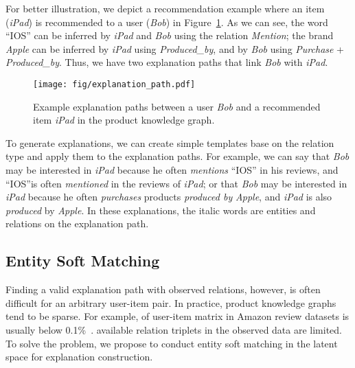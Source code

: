 \documentclass[algorithms,article,accept,moreauthors,pdftex,10pt,a4paper]{Definitions/mdpi}
\begin{document}
For better illustration, we depict a recommendation example where an item (\textit{iPad}) is recommended to a user (\textit{Bob}) in Figure~\ref{fig:example_path}.
As we can see, the word ``IOS'' can be inferred by \textit{iPad} and \textit{Bob} using the relation \textit{Mention}; the brand \textit{Apple} can be inferred by \textit{iPad} using \textit{Produced\_by}, and by \textit{Bob} using \textit{Purchase} + \textit{Produced\_by}.
Thus, we have two explanation paths that link \textit{Bob} with \textit{iPad}.
\begin{figure}[H]
	\centering
	\texttt{[image: fig/explanation\_path.pdf]}
	\caption{Example explanation paths between a user \textit{Bob} and a recommended item \textit{iPad} in the product knowledge graph.}		\vspace{-10pt}
	\label{fig:example_path}
\end{figure}



To generate explanations, we can create simple templates base on the relation type and apply them to the explanation paths.
For example, we can say that \textit{Bob} may be interested in \textit{iPad} because he often \textit{mentions} ``IOS'' in his reviews, and ``IOS''is often \textit{mentioned} in the reviews of \textit{iPad}; or that \textit{Bob} may be interested in \textit{iPad} because he often \textit{purchases} products \textit{produced by} \textit{Apple}, and \textit{iPad} is also \textit{produced} by \textit{Apple}. In these explanations, the italic words are entities and relations on the explanation path.

\subsection{Entity Soft Matching}

Finding a valid explanation path with observed relations, however, is often difficult for an arbitrary user-item pair.
In practice, product knowledge graphs tend to be sparse.
For example,  of user-item matrix in Amazon review datasets is usually below 0.1\%~\cite{mcauley2015image}.
 available relation triplets in the observed data are limited.
To solve the problem, we propose to conduct entity soft matching in the latent space for explanation construction.
\end{document}
